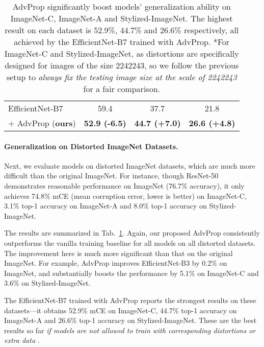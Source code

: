 \documentclass[10pt,twocolumn,letterpaper]{article}
\begin{document}
\begin{table}[t!]
{\begin{tabular}{l|c|c|c}
EfficientNet-B7        & 59.4       & 37.7               & 21.8              \\ 
+ AdvProp (\textbf{ours})    & \textbf{52.9 (-6.5)}     & \textbf{44.7 (+7.0)}& \textbf{26.6 (+4.8)}     \\
\end{tabular}
}
\vskip 0.05in
\caption{AdvProp significantly boost models' generalization ability on ImageNet-C, ImageNet-A and Stylized-ImageNet. 
The highest result on each dataset is 52.9\%, 44.7\% and 26.6\% respectively, all achieved by the EfficientNet-B7 trained with AdvProp. 
*For ImageNet-C and Stylized-ImageNet, as distortions are specifically designed for images of the size 2242243, so we follow the previous setup \cite{Geirhos2018,Hendrycks2018} to \emph{always fix the testing image size at the scale of  2242243} for a fair comparison. 
}
\label{tab:imagenet_variants}
\vspace{-1.4em}
\end{table}



\paragraph{Generalization on Distorted ImageNet Datasets.}
Next, we evaluate models on distorted ImageNet datasets, which are much more difficult than the original ImageNet. For instance, though ResNet-50 demonstrates reasonable performance on ImageNet (76.7\% accuracy), it only achieves 74.8\% mCE (mean corruption error, lower is better) on ImageNet-C, 3.1\% top-1 accuracy on ImageNet-A and 8.0\% top-1 accuracy on Stylized-ImageNet.


The results are summarized in Tab.~\ref{tab:imagenet_variants}. Again, our proposed AdvProp consistently outperforms the vanilla training baseline for all models on all distorted datasets. The improvement here is much more significant than that on the original ImageNet. For example, AdvProp improves EfficientNet-B3 by 0.2\% on ImageNet, and substantially boosts the performance by 5.1\% on ImageNet-C and 3.6\% on Stylized-ImageNet.


The EfficientNet-B7 trained with AdvProp reports the strongest results on these datasets---it obtains 52.9\% mCE on ImageNet-C, 44.7\% top-1 accuracy on ImageNet-A and 26.6\% top-1 accuracy on Stylized-ImageNet. These are the best results so far \emph{if models are not allowed to train with corresponding distortions \cite{Geirhos2018} or extra data \cite{Mahajan2018,Xie2019a}}.
\end{document}

